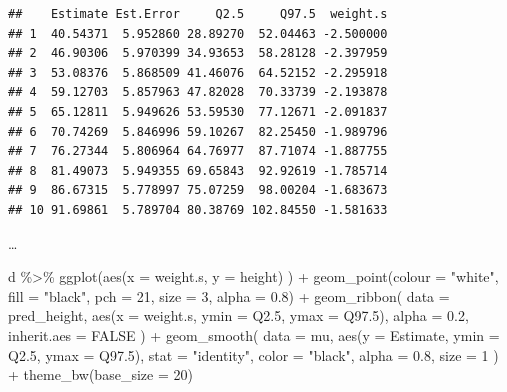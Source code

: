 \documentclass[
  a4paper,11pt,twoside,onecolumn,openright,final,oldfontcommands]{memoir}
\newenvironment{Shaded}{\begin{snugshade}}{\end{snugshade}}
\newcommand{\AttributeTok}[1]{\textcolor[rgb]{0.77,0.63,0.00}{#1}}
\newcommand{\ConstantTok}[1]{\textcolor[rgb]{0.00,0.00,0.00}{#1}}
\newcommand{\DecValTok}[1]{\textcolor[rgb]{0.00,0.00,0.81}{#1}}
\newcommand{\FloatTok}[1]{\textcolor[rgb]{0.00,0.00,0.81}{#1}}
\newcommand{\FunctionTok}[1]{\textcolor[rgb]{0.00,0.00,0.00}{#1}}
\newcommand{\NormalTok}[1]{#1}
\newcommand{\SpecialCharTok}[1]{\textcolor[rgb]{0.00,0.00,0.00}{#1}}
\newcommand{\StringTok}[1]{\textcolor[rgb]{0.31,0.60,0.02}{#1}}
\theoremstyle{definition}
\theoremstyle{definition}
\theoremstyle{definition}
\theoremstyle{remark}
\begin{document}
\begin{verbatim}
##    Estimate Est.Error     Q2.5     Q97.5  weight.s
## 1  40.54371  5.952860 28.89270  52.04463 -2.500000
## 2  46.90306  5.970399 34.93653  58.28128 -2.397959
## 3  53.08376  5.868509 41.46076  64.52152 -2.295918
## 4  59.12703  5.857963 47.82028  70.33739 -2.193878
## 5  65.12811  5.949626 53.59530  77.12671 -2.091837
## 6  70.74269  5.846996 59.10267  82.25450 -1.989796
## 7  76.27344  5.806964 64.76977  87.71074 -1.887755
## 8  81.49073  5.949355 69.65843  92.92619 -1.785714
## 9  86.67315  5.778997 75.07259  98.00204 -1.683673
## 10 91.69861  5.789704 80.38769 102.84550 -1.581633
\end{verbatim}

\ldots{}

\begin{Shaded}
\begin{Highlighting}[]
\NormalTok{d }\SpecialCharTok{\%\textgreater{}\%}
  \FunctionTok{ggplot}\NormalTok{(}\FunctionTok{aes}\NormalTok{(}\AttributeTok{x =}\NormalTok{ weight.s, }\AttributeTok{y =}\NormalTok{ height) ) }\SpecialCharTok{+}
  \FunctionTok{geom\_point}\NormalTok{(}\AttributeTok{colour =} \StringTok{"white"}\NormalTok{, }\AttributeTok{fill =} \StringTok{"black"}\NormalTok{, }\AttributeTok{pch =} \DecValTok{21}\NormalTok{, }\AttributeTok{size =} \DecValTok{3}\NormalTok{, }\AttributeTok{alpha =} \FloatTok{0.8}\NormalTok{) }\SpecialCharTok{+}
  \FunctionTok{geom\_ribbon}\NormalTok{(}
    \AttributeTok{data =}\NormalTok{ pred\_height, }\FunctionTok{aes}\NormalTok{(}\AttributeTok{x =}\NormalTok{ weight.s, }\AttributeTok{ymin =}\NormalTok{ Q2}\FloatTok{.5}\NormalTok{, }\AttributeTok{ymax =}\NormalTok{ Q97}\FloatTok{.5}\NormalTok{),}
    \AttributeTok{alpha =} \FloatTok{0.2}\NormalTok{, }\AttributeTok{inherit.aes =} \ConstantTok{FALSE}
\NormalTok{    ) }\SpecialCharTok{+}
  \FunctionTok{geom\_smooth}\NormalTok{(}
    \AttributeTok{data =}\NormalTok{ mu, }\FunctionTok{aes}\NormalTok{(}\AttributeTok{y =}\NormalTok{ Estimate, }\AttributeTok{ymin =}\NormalTok{ Q2}\FloatTok{.5}\NormalTok{, }\AttributeTok{ymax =}\NormalTok{ Q97}\FloatTok{.5}\NormalTok{),}
    \AttributeTok{stat =} \StringTok{"identity"}\NormalTok{, }\AttributeTok{color =} \StringTok{"black"}\NormalTok{, }\AttributeTok{alpha =} \FloatTok{0.8}\NormalTok{, }\AttributeTok{size =} \DecValTok{1}
\NormalTok{    ) }\SpecialCharTok{+}
  \FunctionTok{theme\_bw}\NormalTok{(}\AttributeTok{base\_size =} \DecValTok{20}\NormalTok{)}
\end{Highlighting}
\end{Shaded}
\end{document}

